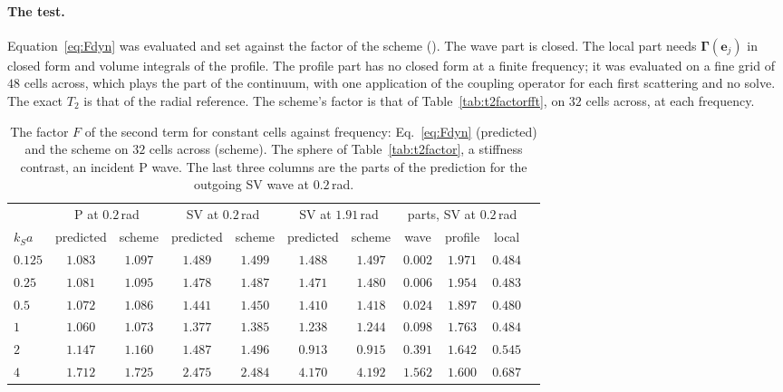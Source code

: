 \documentclass[11pt,a4paper]{article}
\begin{document}
\paragraph{The test.} Equation~\eqref{eq:Fdyn} was evaluated and set against the factor of the scheme
(). The wave part is closed. The local part needs
$\boldsymbol\Gamma(\mathbf{e}_j)$ in closed form and volume integrals of the profile. The profile part has
no closed form at a finite frequency; it was evaluated on a fine grid of $48$ cells across, which plays
the part of the continuum, with one application of the coupling operator for each first scattering and no
solve. The exact $T_2$ is that of the radial reference. The scheme's factor is that of
Table~\ref{tab:t2factorfft}, on $32$ cells across, at each frequency.
\begin{table}[htbp]
\centering
\caption{The factor $F$ of the second term for constant cells against frequency: Eq.~\eqref{eq:Fdyn}
(predicted) and the scheme on $32$ cells across (scheme). The sphere of Table~\ref{tab:t2factor}, a
stiffness contrast, an incident P wave. The last three columns are the parts of the prediction for the
outgoing SV wave at $0.2$\,rad.}\label{tab:factorfreq}
\small
\begin{tabular}{@{}lcccccccccc@{}}
\toprule
 & \multicolumn{2}{c}{P at $0.2$\,rad} & \multicolumn{2}{c}{SV at $0.2$\,rad} &
   \multicolumn{2}{c}{SV at $1.91$\,rad} & \multicolumn{3}{c}{parts, SV at $0.2$\,rad} \\
$k_Sa$ & predicted & scheme & predicted & scheme & predicted & scheme & wave & profile & local \\
\midrule
$0.125$ & $1.083$ & $1.097$ & $1.489$ & $1.499$ & $1.488$ & $1.497$ & $0.002$ & $1.971$ & $0.484$ \\
$0.25$  & $1.081$ & $1.095$ & $1.478$ & $1.487$ & $1.471$ & $1.480$ & $0.006$ & $1.954$ & $0.483$ \\
$0.5$   & $1.072$ & $1.086$ & $1.441$ & $1.450$ & $1.410$ & $1.418$ & $0.024$ & $1.897$ & $0.480$ \\
$1$     & $1.060$ & $1.073$ & $1.377$ & $1.385$ & $1.238$ & $1.244$ & $0.098$ & $1.763$ & $0.484$ \\
$2$     & $1.147$ & $1.160$ & $1.487$ & $1.496$ & $0.913$ & $0.915$ & $0.391$ & $1.642$ & $0.545$ \\
$4$     & $1.712$ & $1.725$ & $2.475$ & $2.484$ & $4.170$ & $4.192$ & $1.562$ & $1.600$ & $0.687$ \\
\bottomrule
\end{tabular}
\end{table}
\end{document}
